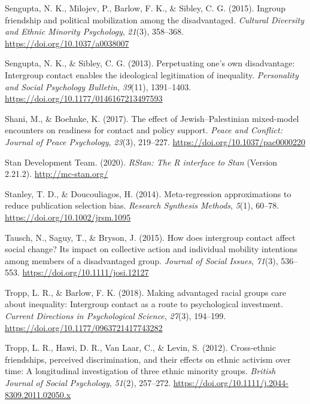 \documentclass[12pt, letterpaper]{article}
\begin{document}
\leavevmode\hypertarget{ref-sengupta_ingroup_2015}{}%
Sengupta, N. K., Milojev, P., Barlow, F. K., \& Sibley, C. G. (2015).
Ingroup friendship and political mobilization among the disadvantaged.
\emph{Cultural Diversity and Ethnic Minority Psychology}, \emph{21}(3),
358--368. \url{https://doi.org/10.1037/a0038007}

\leavevmode\hypertarget{ref-sengupta_perpetuating_2013}{}%
Sengupta, N. K., \& Sibley, C. G. (2013). Perpetuating one's own
disadvantage: Intergroup contact enables the ideological legitimation of
inequality. \emph{Personality and Social Psychology Bulletin},
\emph{39}(11), 1391--1403.
\url{https://doi.org/10.1177/0146167213497593}

\leavevmode\hypertarget{ref-shani_effect_2017}{}%
Shani, M., \& Boehnke, K. (2017). The effect of Jewish--Palestinian
mixed-model encounters on readiness for contact and policy support.
\emph{Peace and Conflict: Journal of Peace Psychology}, \emph{23}(3),
219--227. \url{https://doi.org/10.1037/pac0000220}

\leavevmode\hypertarget{ref-stan_development_team_rstan:_2020}{}%
Stan Development Team. (2020). \emph{RStan: The R interface to Stan}
(Version 2.21.2). \url{http://mc-stan.org/}

\leavevmode\hypertarget{ref-stanley_meta-regression_2014}{}%
Stanley, T. D., \& Doucouliagos, H. (2014). Meta-regression
approximations to reduce publication selection bias. \emph{Research
Synthesis Methods}, \emph{5}(1), 60--78.
\url{https://doi.org/10.1002/jrsm.1095}

\leavevmode\hypertarget{ref-tausch_how_2015}{}%
Tausch, N., Saguy, T., \& Bryson, J. (2015). How does intergroup contact
affect social change? Its impact on collective action and individual
mobility intentions among members of a disadvantaged group.
\emph{Journal of Social Issues}, \emph{71}(3), 536--553.
\url{https://doi.org/10.1111/josi.12127}

\leavevmode\hypertarget{ref-tropp_making_2018}{}%
Tropp, L. R., \& Barlow, F. K. (2018). Making advantaged racial groups
care about inequality: Intergroup contact as a route to psychological
investment. \emph{Current Directions in Psychological Science},
\emph{27}(3), 194--199. \url{https://doi.org/10.1177/0963721417743282}

\leavevmode\hypertarget{ref-tropp_crossethnic_2012}{}%
Tropp, L. R., Hawi, D. R., Van Laar, C., \& Levin, S. (2012).
Cross‐ethnic friendships, perceived discrimination, and their effects on
ethnic activism over time: A longitudinal investigation of three ethnic
minority groups. \emph{British Journal of Social Psychology},
\emph{51}(2), 257--272.
\url{https://doi.org/10.1111/j.2044-8309.2011.02050.x}
\end{document}
